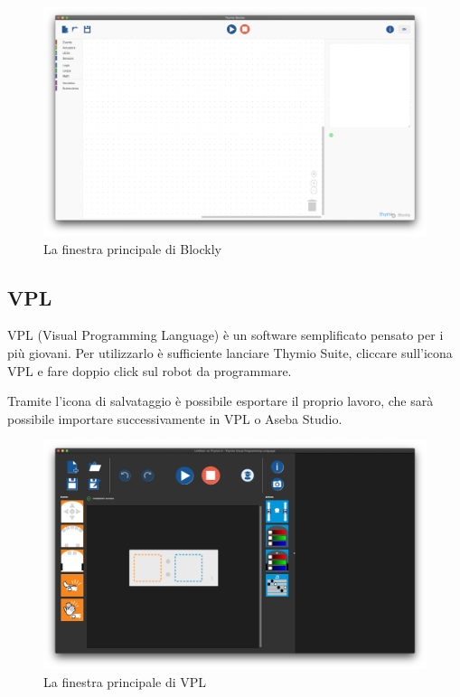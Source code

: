 \documentclass[12pt]{article}
\begin{document}
\begin{figure}[H]
	\includegraphics[width=\textwidth]{img/blockly.png}
	\caption{La finestra principale di Blockly}
	\label{main_blockly}
\end{figure}

\newpage

\subsection{VPL}

VPL (Visual Programming Language) è un software semplificato pensato per i più giovani. Per utilizzarlo è sufficiente lanciare Thymio Suite, cliccare sull'icona VPL e fare doppio click sul robot da programmare.

Tramite l'icona di salvataggio è possibile esportare il proprio lavoro, che sarà possibile importare successivamente in VPL o Aseba Studio.

\begin{figure}[H]
	\includegraphics[width=\textwidth]{img/vpl.png}
	\caption{La finestra principale di VPL}
	\label{main_vpl}
\end{figure}
\end{document}
